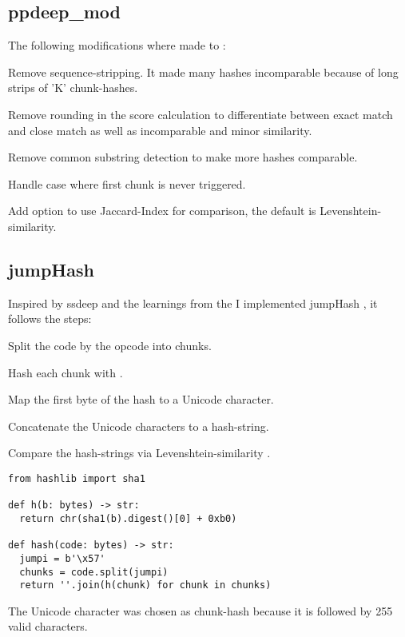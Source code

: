 \documentclass[../main.tex]{subfiles}
\begin{document}
\subsection{ppdeep\_mod \label{sec:ppdeep_mod}}
The following modifications where made to :
\begin{ul}
  \item Remove sequence-stripping. It made many hashes incomparable because of long strips of 'K' chunk-hashes.
  \item Remove rounding in the score calculation to differentiate between exact match and close match as well as incomparable and minor similarity.
  \item Remove common substring detection to make more hashes comparable.
  \item Handle case where first chunk is never triggered.
  \item Add option to use Jaccard-Index for comparison, the default is Levenshtein-similarity.
\end{ul}

\subsection{jumpHash \label{sec:jump}}
Inspired by ssdeep and the learnings from the  I implemented jumpHash \cite{ethereum-contract-similarity}, it follows the steps:
\begin{ol}
  \item Split the code by the opcode  into chunks.
  \item Hash each chunk with .
  \item Map the first byte of the  hash to a Unicode character.
  \item Concatenate the Unicode characters to a hash-string.
  \item Compare the hash-strings via Levenshtein-similarity .
\end{ol}
\begin{lstlisting}[style=pymd]
from hashlib import sha1

def h(b: bytes) -> str:
  return chr(sha1(b).digest()[0] + 0xb0)

def hash(code: bytes) -> str:
  jumpi = b'\x57'
  chunks = code.split(jumpi)
  return ''.join(h(chunk) for chunk in chunks)
\end{lstlisting}
The Unicode character  was chosen as  chunk-hash because it is followed by 255 valid characters.
\end{document}
